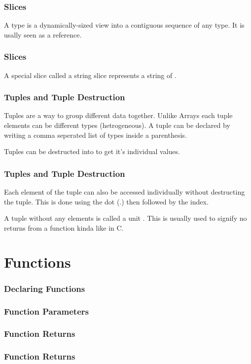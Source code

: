 \documentclass{beamer}
\begin{document}
\begin{frame}
  \frametitle{Slices}
  A  type is a dynamically-sized view into a contiguous sequence of any type. It is usally seen as a reference.
  
\end{frame}

\begin{frame}
  \frametitle{Slices}
  A special slice called a string slice  represents a string of .
  
\end{frame}

\begin{frame}
  \frametitle{Tuples and Tuple Destruction}
  Tuples are a way to group different data together. Unlike Arrays each tuple elements can be different types (hetrogeneous). A tuple can be declared by writing a comma seperated list of types inside a parenthesis.
  
  Tuples can be destructed into to get it's individual values.
  
\end{frame}

\begin{frame}
  \frametitle{Tuples and Tuple Destruction}
  Each element of the tuple can also be accessed individually without destructing the tuple. This is done using the dot (.) then followed by the index.
  
  A tuple without any elements is called a unit \inlinecode{()}. This is usually used to signify no returns from a function kinda like  in C.
\end{frame}

\section{Functions}
\begin{frame}
  \frametitle{Declaring Functions}
\end{frame}

\begin{frame}
  \frametitle{Function Parameters}
\end{frame}

\begin{frame}
  \frametitle{Function Returns}
\end{frame}

\begin{frame}
  \frametitle{Function Returns}
\end{frame}
\end{document}
